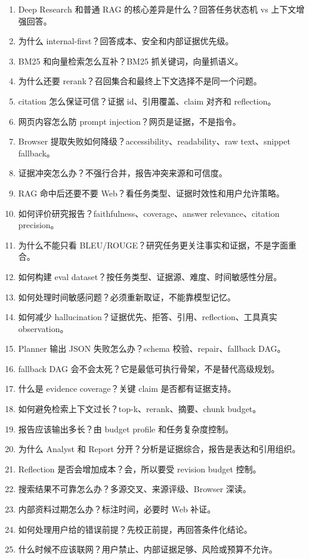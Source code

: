 \begin{enumerate}[leftmargin=2em]
  \item Deep Research 和普通 RAG 的核心差异是什么？回答任务状态机 vs 上下文增强回答。
  \item 为什么 internal-first？回答成本、安全和内部证据优先级。
  \item BM25 和向量检索怎么互补？BM25 抓关键词，向量抓语义。
  \item 为什么还要 rerank？召回集合和最终上下文选择不是同一个问题。
  \item citation 怎么保证可信？证据 id、引用覆盖、claim 对齐和 reflection。
  \item 网页内容怎么防 prompt injection？网页是证据，不是指令。
  \item Browser 提取失败如何降级？accessibility、readability、raw text、snippet fallback。
  \item 证据冲突怎么办？不强行合并，报告冲突来源和可信度。
  \item RAG 命中后还要不要 Web？看任务类型、证据时效性和用户允许策略。
  \item 如何评价研究报告？faithfulness、coverage、answer relevance、citation precision。
  \item 为什么不能只看 BLEU/ROUGE？研究任务更关注事实和证据，不是字面重合。
  \item 如何构建 eval dataset？按任务类型、证据源、难度、时间敏感性分层。
  \item 如何处理时间敏感问题？必须重新取证，不能靠模型记忆。
  \item 如何减少 hallucination？证据优先、拒答、引用、reflection、工具真实 observation。
  \item Planner 输出 JSON 失败怎么办？schema 校验、repair、fallback DAG。
  \item fallback DAG 会不会太死？它是最低可执行骨架，不是替代高级规划。
  \item 什么是 evidence coverage？关键 claim 是否都有证据支持。
  \item 如何避免检索上下文过长？top-k、rerank、摘要、chunk budget。
  \item 报告应该输出多长？由 budget profile 和任务复杂度控制。
  \item 为什么 Analyst 和 Report 分开？分析是证据综合，报告是表达和引用组织。
  \item Reflection 是否会增加成本？会，所以要受 revision budget 控制。
  \item 搜索结果不可靠怎么办？多源交叉、来源评级、Browser 深读。
  \item 内部资料过期怎么办？标注时间，必要时 Web 补证。
  \item 如何处理用户给的错误前提？先校正前提，再回答条件化结论。
  \item 什么时候不应该联网？用户禁止、内部证据足够、风险或预算不允许。
\end{enumerate}

